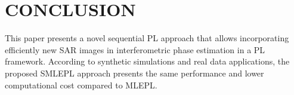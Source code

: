 \vspace{-5pt} 
\section{CONCLUSION}
\label{sec:conclusion}
\vspace{-5pt} 
This paper presents a novel sequential \acs{PL} approach that allows incorporating efficiently new \acs{SAR} images in interferometric phase estimation in a \acs{PL} framework. According to synthetic simulations and real data applications, the proposed \acs{SMLEPL} approach presents the same performance and lower computational cost compared to \acs{MLEPL}. %
